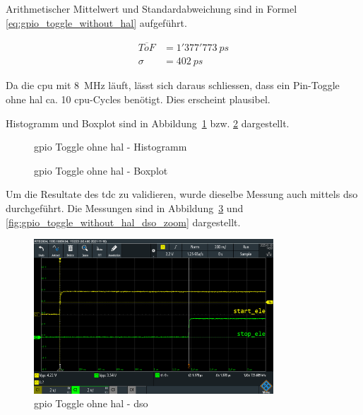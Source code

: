 Arithmetischer Mittelwert und Standardabweichung sind in Formel \ref{eq:gpio_toggle_without_hal} aufgeführt.

\begin{equation}\label{eq:gpio_toggle_without_hal}
    \begin{split}
        \overline{ToF} &= 1'377'773~ps\\
        \sigma         &= 402~ps
    \end{split}
\end{equation}

Da die \acrshort{cpu} mit 8~MHz läuft, lässt sich daraus schliessen, dass ein Pin-Toggle ohne \acrshort{hal} ca. 10
\acrshort{cpu}-Cycles benötigt. Dies erscheint plausibel.

Histogramm und Boxplot sind in Abbildung~\ref{fig:gpio_toggle_without_hal_histogram} bzw.
\ref{fig:gpio_toggle_without_hal_boxplot} dargestellt.

\begin{figure}[H]
    \centering
    
    \caption{\acrshort{gpio} Toggle ohne \acrshort{hal} - Histogramm}\label{fig:gpio_toggle_without_hal_histogram}
\end{figure}

\begin{figure}[H]
    \centering
    
    \caption{\acrshort{gpio} Toggle ohne \acrshort{hal} - Boxplot}\label{fig:gpio_toggle_without_hal_boxplot}
\end{figure}

Um die Resultate des \acrshort{tdc} zu validieren, wurde dieselbe Messung auch mittels \acrfull{dso} durchgeführt. Die
Messungen sind in Abbildung~\ref{fig:gpio_toggle_without_hal_dso} und \ref{fig:gpio_toggle_without_hal_dso_zoom}
dargestellt.

\begin{figure}[H]
    \centering
    \includegraphics[width=0.8\textwidth]{graphics/gpio_toggle_without_hal_dso.png}
    \caption{\acrshort{gpio} Toggle ohne \acrshort{hal} - \acrshort{dso}}\label{fig:gpio_toggle_without_hal_dso}
\end{figure}

